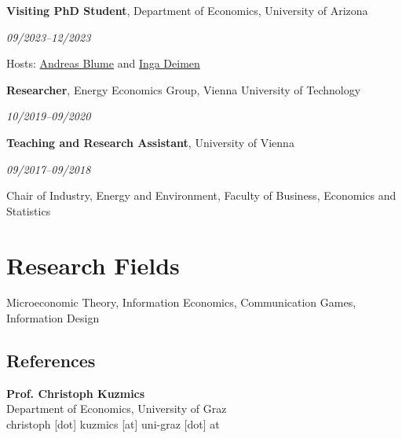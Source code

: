\documentclass[11pt,letterpaper]{article}
\newcommand{\entry}[2]{%
  \par\noindent
  \begin{minipage}[t]{0.73\textwidth}
    \raggedright #1
  \end{minipage}%
  \hfill
  \begin{minipage}[t]{0.24\textwidth}
    \raggedleft\itshape #2
  \end{minipage}%
  \par
}
\newcommand{\cvsection}[1]{%
  \Needspace{6\baselineskip}%
  \section*{#1}%
}
\begin{document}
\medskip
\entry{\textbf{Visiting PhD Student}, Department of Economics, University of Arizona}{09/2023--12/2023}
Hosts: \href{https://sites.google.com/site/andreas3blume/}{Andreas Blume} and \href{https://ingadeimen.weebly.com/}{Inga Deimen}

\medskip
\entry{\textbf{Researcher}, Energy Economics Group, Vienna University of Technology}{10/2019--09/2020}

\medskip
\entry{\textbf{Teaching and Research Assistant}, University of Vienna}{09/2017--09/2018}
Chair of Industry, Energy and Environment, Faculty of Business, Economics and Statistics

\cvsection{Research Fields}
Microeconomic Theory, Information Economics, Communication Games, Information Design

\begin{samepage}
\cvsection{References}
\textbf{Prof. Christoph Kuzmics}\\
Department of Economics, University of Graz\\
christoph [dot] kuzmics [at] uni-graz [dot] at
\end{samepage}
\end{document}
